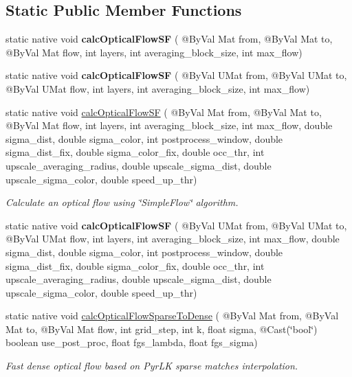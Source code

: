 \subsection*{Static Public Member Functions}
\begin{DoxyCompactItemize}
\item 
static native void {\bfseries calc\+Optical\+Flow\+SF} ( @By\+Val Mat from, @By\+Val Mat to, @By\+Val Mat flow, int layers, int averaging\+\_\+block\+\_\+size, int max\+\_\+flow)
\item 
static native void {\bfseries calc\+Optical\+Flow\+SF} ( @By\+Val U\+Mat from, @By\+Val U\+Mat to, @By\+Val U\+Mat flow, int layers, int averaging\+\_\+block\+\_\+size, int max\+\_\+flow)
\item 
static native void \hyperlink{group__optflow_ga76902de70b538596bed7e39b7777384d}{calc\+Optical\+Flow\+SF} ( @By\+Val Mat from, @By\+Val Mat to, @By\+Val Mat flow, int layers, int averaging\+\_\+block\+\_\+size, int max\+\_\+flow, double sigma\+\_\+dist, double sigma\+\_\+color, int postprocess\+\_\+window, double sigma\+\_\+dist\+\_\+fix, double sigma\+\_\+color\+\_\+fix, double occ\+\_\+thr, int upscale\+\_\+averaging\+\_\+radius, double upscale\+\_\+sigma\+\_\+dist, double upscale\+\_\+sigma\+\_\+color, double speed\+\_\+up\+\_\+thr)
\begin{DoxyCompactList}\small\item\em Calculate an optical flow using \char`\"{}\+Simple\+Flow\char`\"{} algorithm. \end{DoxyCompactList}\item 
static native void {\bfseries calc\+Optical\+Flow\+SF} ( @By\+Val U\+Mat from, @By\+Val U\+Mat to, @By\+Val U\+Mat flow, int layers, int averaging\+\_\+block\+\_\+size, int max\+\_\+flow, double sigma\+\_\+dist, double sigma\+\_\+color, int postprocess\+\_\+window, double sigma\+\_\+dist\+\_\+fix, double sigma\+\_\+color\+\_\+fix, double occ\+\_\+thr, int upscale\+\_\+averaging\+\_\+radius, double upscale\+\_\+sigma\+\_\+dist, double upscale\+\_\+sigma\+\_\+color, double speed\+\_\+up\+\_\+thr)
\item 
static native void \hyperlink{group__optflow_gab202f6c782e9356cf2a96620732785a9}{calc\+Optical\+Flow\+Sparse\+To\+Dense} ( @By\+Val Mat from, @By\+Val Mat to, @By\+Val Mat flow, int grid\+\_\+step, int k, float sigma, @Cast(\char`\"{}bool\char`\"{}) boolean use\+\_\+post\+\_\+proc, float fgs\+\_\+lambda, float fgs\+\_\+sigma)
\begin{DoxyCompactList}\small\item\em Fast dense optical flow based on Pyr\+LK sparse matches interpolation. \end{DoxyCompactList}\item 

\end{DoxyCompactItemize}
